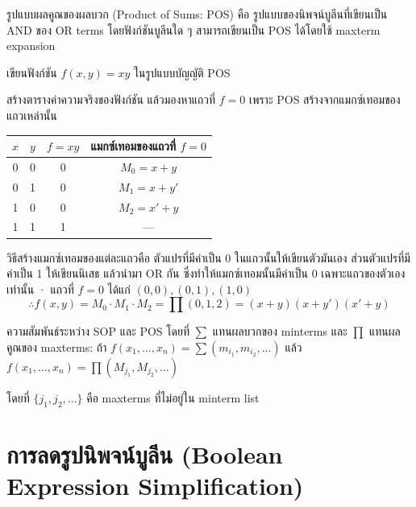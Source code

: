 \begin{definition}
รูปแบบผลคูณของผลบวก (Product of Sums: POS) คือ รูปแบบของนิพจน์บูลีนที่เขียนเป็น AND ของ OR terms โดยฟังก์ชันบูลีนใด ๆ สามารถเขียนเป็น POS ได้โดยใช้ maxterm expansion
\end{definition}

\begin{ex}
\label{ex:canonical-pos}
เขียนฟังก์ชัน $f(x, y) = xy$ ในรูปแบบบัญญัติ POS
\end{ex}
\begin{solution}
สร้างตารางค่าความจริงของฟังก์ชัน แล้วมองหาแถวที่ $f = 0$ เพราะ POS สร้างจากแมกซ์เทอมของแถวเหล่านั้น
\begin{center}
\begin{tabular}{|c|c|c|c|}
\hline
$x$ & $y$ & $f = xy$ & แมกซ์เทอมของแถวที่ $f=0$ \\
\hline
0 & 0 & 0 & $M_0 = x + y$ \\
\hline
0 & 1 & 0 & $M_1 = x + y'$ \\
\hline
1 & 0 & 0 & $M_2 = x' + y$ \\
\hline
1 & 1 & 1 & --- \\
\hline
\end{tabular}
\end{center}
วิธีสร้างแมกซ์เทอมของแต่ละแถวคือ ตัวแปรที่มีค่าเป็น 0 ในแถวนั้นให้เขียนตัวมันเอง ส่วนตัวแปรที่มีค่าเป็น 1 ให้เขียนนิเสธ แล้วนำมา OR กัน ซึ่งทำให้แมกซ์เทอมนั้นมีค่าเป็น 0 เฉพาะแถวของตัวเองเท่านั้น · แถวที่ $f = 0$ ได้แก่ $(0,0), (0,1), (1,0)$
\[
\therefore f(x, y) = M_0 \cdot M_1 \cdot M_2 = \prod(0, 1, 2) = (x + y)(x + y')(x' + y)
\]
\solhere
\end{solution}

\begin{prop}
ความสัมพันธ์ระหว่าง SOP และ POS โดยที่ $\sum$ แทนผลบวกของ minterms และ $\prod$ แทนผลคูณของ maxterms:
ถ้า $f(x_1, \ldots, x_n) = \sum(m_{i_1}, m_{i_2}, \ldots)$ แล้ว $f(x_1, \ldots, x_n) = \prod(M_{j_1}, M_{j_2}, \ldots)$

โดยที่ $\{j_1, j_2, \ldots\}$ คือ maxterms ที่ไม่อยู่ใน minterm list
\end{prop}

\section{การลดรูปนิพจน์บูลีน (Boolean Expression Simplification)}
\label{sec:boolean-simplification}

